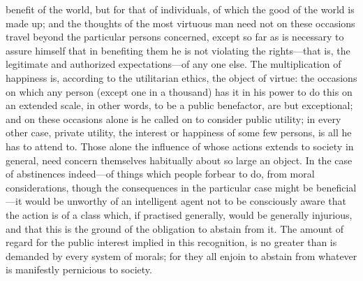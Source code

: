benefit of the world, but for that of individuals, of which the good
of the world is made up; and the thoughts of the most virtuous man
need not on these occasions travel beyond  the particular
persons concerned, except so far as is necessary to assure himself
that in benefiting them he is not violating the rights---that is, the
legitimate and authorized ex\-pec\-ta\-tions---of any one else. The
multiplication of happiness is, according to the utilitarian ethics,
the object of virtue: the occasions on which any person (except one in
a thousand) has it in his power to do this on an extended scale, in
other words, to be a public benefactor, are but exceptional; and on
these occasions alone is he called on to consider public utility; in
every other case, private utility, the interest or happiness of some
few persons, is all he has to attend to. Those alone the influence of
whose actions extends to society in general, need concern themselves
habitually about so large an object. In the case of abstinences
in\-deed---of things which people forbear to do, from moral
considerations, though the consequences in the particular case might
be ben\-e\-fi\-cial---it would be unworthy of an intelligent agent not
to be consciously aware that the action is of a class which, if
practised generally, would be generally injurious, and that this is
the ground of the obligation to abstain from it. The amount of regard
for the public interest implied in this recognition, is no greater
than is demanded by every system of morals; for they all enjoin to
abstain from whatever is manifestly pernicious to society.

